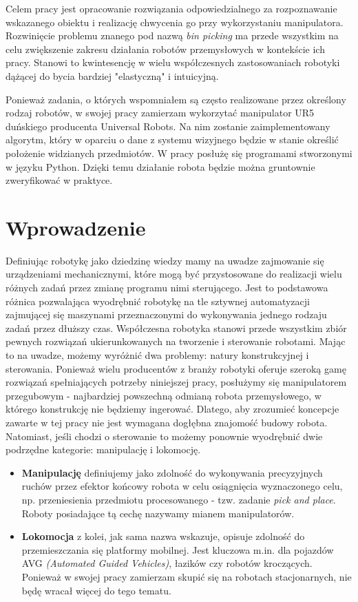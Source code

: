 \documentclass{article}
\begin{document}
Celem pracy jest opracowanie rozwiązania odpowiedzialnego za rozpoznawanie wskazanego obiektu i realizację chwycenia go przy wykorzystaniu manipulatora. Rozwinięcie problemu znanego pod nazwą \emph{bin picking} ma przede wszystkim na celu zwiększenie zakresu działania robotów przemysłowych w kontekście ich pracy. Stanowi to kwintesencję w wielu współczesnych zastosowaniach robotyki dążącej do bycia bardziej "elastyczną" i intuicyjną.

Ponieważ zadania, o których wspomniałem są często realizowane przez określony rodzaj robotów, w swojej pracy zamierzam wykorzytać manipulator UR5 duńskiego producenta Universal Robots. Na nim zostanie zaimplementowany algorytm, który w oparciu o dane z systemu wizyjnego będzie w stanie określić położenie widzianych przedmiotów. W pracy posłużę się programami stworzonymi w języku Python. Dzięki temu działanie robota będzie można gruntownie zweryfikować w praktyce.

\newpage
\tableofcontents

\newpage
\section{\LARGE{Wprowadzenie}}
Definiując robotykę jako dziedzinę wiedzy mamy na uwadze zajmowanie się urządzeniami mechanicznymi, które mogą być przystosowane do realizacji wielu różnych zadań przez zmianę programu nimi sterującego. Jest to podstawowa różnica pozwalająca wyodrębnić robotykę na tle sztywnej automatyzacji zajmującej się maszynami przeznaczonymi do wykonywania jednego rodzaju zadań przez dłuższy czas. Współczesna robotyka stanowi przede wszystkim zbiór pewnych rozwiązań ukierunkowanych na tworzenie i sterowanie robotami. Mając to na uwadze, możemy wyróżnić dwa problemy: natury konstrukcyjnej i sterowania. Ponieważ wielu producentów z branży robotyki oferuje szeroką gamę rozwiązań spełniających potrzeby niniejszej pracy, posłużymy się manipulatorem przegubowym - najbardziej powszechną odmianą robota przemysłowego, w którego konstrukcję nie będziemy ingerować. Dlatego, aby zrozumieć koncepcje zawarte w tej pracy nie jest wymagana dogłębna znajomość budowy robota. Natomiast, jeśli chodzi o sterowanie to możemy ponownie wyodrębnić dwie podrzędne kategorie: manipulację i lokomocję. 

\begin{itemize}
\item \textbf{Manipulację} definiujemy jako zdolność do wykonywania precyzyjnych ruchów przez efektor końcowy robota w celu osiągnięcia wyznaczonego celu, np. przeniesienia przedmiotu procesowanego - tzw. zadanie \emph{pick and place}. Roboty posiadające tą cechę nazywamy mianem manipulatorów.

\item \textbf{Lokomocja} z kolei, jak sama nazwa wskazuje, opisuje zdolność do przemieszczania się platformy mobilnej. Jest kluczowa m.in. dla pojazdów AVG \emph{(Automated Guided Vehicles)}, łazików czy robotów kroczących. Ponieważ w swojej pracy zamierzam skupić się na robotach stacjonarnych, nie będę wracał więcej do tego tematu.
\end{itemize}
\end{document}
